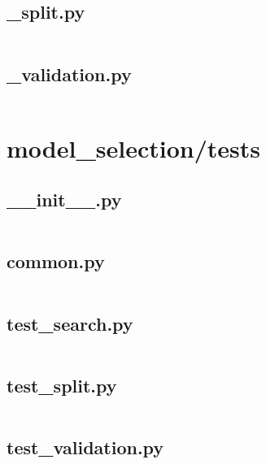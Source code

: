\documentclass{article}
\begin{document}
\subsection{\_split.py}
\inputminted{python}{/home/dufferzafar/dev/@clones/scikit-learn/sklearn/model_selection/_split.py}
\newpage

\subsection{\_validation.py}
\inputminted{python}{/home/dufferzafar/dev/@clones/scikit-learn/sklearn/model_selection/_validation.py}
\newpage

\section{model\_selection/tests}

\subsection{\_\_init\_\_.py}
\inputminted{python}{/home/dufferzafar/dev/@clones/scikit-learn/sklearn/model_selection/tests/__init__.py}
\newpage

\subsection{common.py}
\inputminted{python}{/home/dufferzafar/dev/@clones/scikit-learn/sklearn/model_selection/tests/common.py}
\newpage

\subsection{test\_search.py}
\inputminted{python}{/home/dufferzafar/dev/@clones/scikit-learn/sklearn/model_selection/tests/test_search.py}
\newpage

\subsection{test\_split.py}
\inputminted{python}{/home/dufferzafar/dev/@clones/scikit-learn/sklearn/model_selection/tests/test_split.py}
\newpage

\subsection{test\_validation.py}
\inputminted{python}{/home/dufferzafar/dev/@clones/scikit-learn/sklearn/model_selection/tests/test_validation.py}
\newpage
\end{document}
